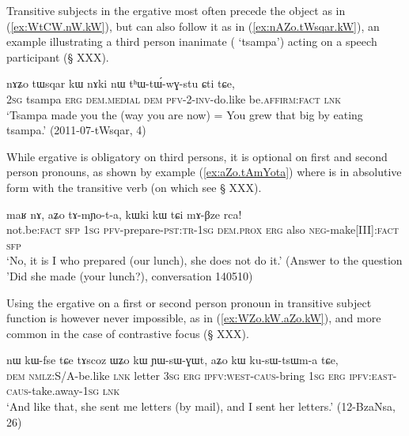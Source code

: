 Transitive subjects in the ergative most often precede the object as in (\ref{ex:WtCW.nW.kW}), but can also follow it as in (\ref{ex:nAZo.tWsqar.kW}), an example illustrating a third person inanimate ( `tsampa') acting on a speech participant (§ XXX).

\begin{exe}
\ex \label{ex:nAZo.tWsqar.kW}
\gll nɤʑo tɯsqar kɯ nɤki nɯ tʰɯ-tɯ́-wɣ-stu ɕti tɕe,  \\
\textsc{2sg} tsampa \textsc{erg} \textsc{dem.medial} \textsc{dem} \textsc{pfv}-2-\textsc{inv}-do.like be.\textsc{affirm}:\textsc{fact} \textsc{lnk} \\
\glt `Tsampa made you the (way you are now) = You grew that big by eating tsampa.' (2011-07-tWsqar, 4)
\end{exe}

While ergative is obligatory on third persons, it is optional on first and second person pronouns, as shown by example (\ref{ex:aZo.tAmYota}) where  is in absolutive form with the transitive verb  (on which see § XXX). 

\begin{exe}
\ex \label{ex:aZo.tAmYota}
\gll maʁ nɤ, aʑo tɤ-mɲo-t-a, kɯki kɯ tɕi mɤ-βze rca!  \\
not.be:\textsc{fact} \textsc{sfp} \textsc{1sg} \textsc{pfv}-prepare-\textsc{pst}:\textsc{tr}-\textsc{1sg} \textsc{dem}.\textsc{prox} \textsc{erg} also \textsc{neg}-make[III]:\textsc{fact} \textsc{sfp} \\
\glt `No, it is I who prepared (our lunch), she does not do it.' (Answer to the question 'Did she made (your lunch?), conversation 140510)
\end{exe}

Using the ergative on a first  or second person pronoun in transitive subject function is however never impossible, as in (\ref{ex:WZo.kW.aZo.kW}), and more common in the case of contrastive focus (§ XXX).

\begin{exe}
\ex \label{ex:WZo.kW.aZo.kW}
\gll nɯ kɯ-fse tɕe tɤscoz ɯʑo kɯ ɲɯ-sɯ-ɣɯt, aʑo kɯ ku-sɯ-tsɯm-a tɕe, \\
\textsc{dem} \textsc{nmlz}:S/A-be.like \textsc{lnk} letter \textsc{3sg} \textsc{erg} \textsc{ipfv}:\textsc{west}-\textsc{caus}-bring \textsc{1sg} \textsc{erg} \textsc{ipfv}:\textsc{east}-\textsc{caus}-take.away-\textsc{1sg} \textsc{lnk} \\
\glt `And like that, she sent me letters (by mail), and I sent her letters.' (12-BzaNsa, 26)
\end{exe}

